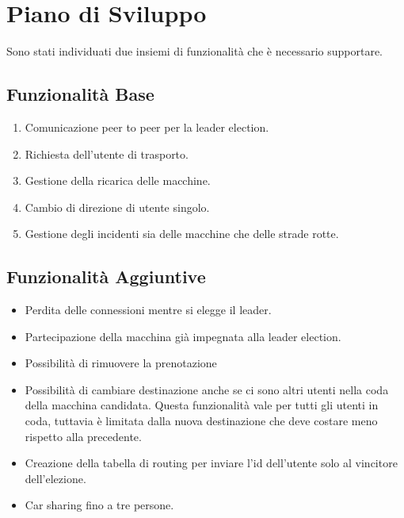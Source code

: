 \newpage

\section{Piano di Sviluppo}

Sono stati individuati due insiemi di funzionalità che è necessario supportare.
\subsection{Funzionalità Base}

\begin{enumerate}
	\item Comunicazione peer to peer per la leader election.
	\item Richiesta dell'utente di trasporto.
	\item Gestione della ricarica delle macchine.
	\item Cambio di direzione di utente singolo.
	\item Gestione degli incidenti sia delle macchine che delle strade rotte.
\end{enumerate}

\subsection{Funzionalità Aggiuntive}

\begin{itemize}
	\item Perdita delle connessioni mentre si elegge il leader.
	\item Partecipazione della macchina già impegnata alla leader election.
	\item Possibilità di rimuovere la prenotazione
	\item Possibilità di cambiare destinazione anche se ci sono altri utenti nella coda della macchina candidata. Questa funzionalità vale per tutti gli utenti in coda, tuttavia è limitata dalla nuova destinazione che deve costare meno rispetto alla precedente.
	\item Creazione della tabella di routing per inviare l'id dell'utente solo al vincitore dell'elezione.
	\item Car sharing fino a tre persone.
\end{itemize}

